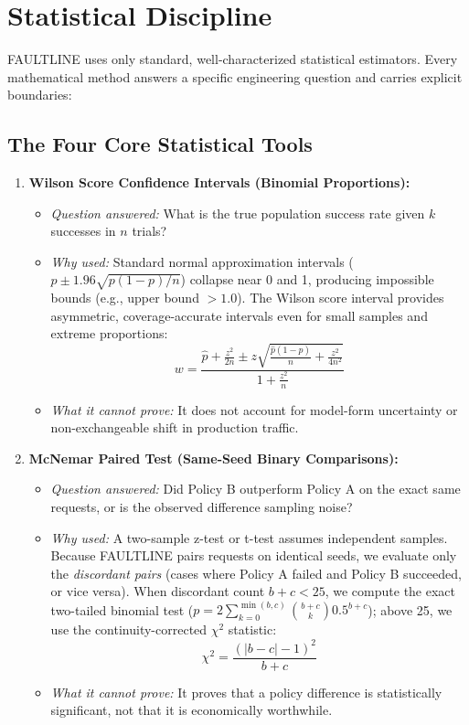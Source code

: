 \vspace{12pt}
\section{Statistical Discipline}

FAULTLINE uses only standard, well-characterized statistical estimators. Every mathematical method answers a specific engineering question and carries explicit boundaries:

\subsection{The Four Core Statistical Tools}

\begin{enumerate}
    \item \textbf{Wilson Score Confidence Intervals (Binomial Proportions):}
    \begin{itemize}
        \item \textit{Question answered:} What is the true population success rate given $k$ successes in $n$ trials?
        \item \textit{Why used:} Standard normal approximation intervals ($p \pm 1.96\sqrt{p(1-p)/n}$) collapse near 0 and 1, producing impossible bounds (e.g., upper bound $>1.0$). The Wilson score interval provides asymmetric, coverage-accurate intervals even for small samples and extreme proportions:
        \[
        w = \frac{\hat{p} + \frac{z^2}{2n} \pm z \sqrt{\frac{\hat{p}(1-\hat{p})}{n} + \frac{z^2}{4n^2}}}{1 + \frac{z^2}{n}}
        \]
        \item \textit{What it cannot prove:} It does not account for model-form uncertainty or non-exchangeable shift in production traffic.
    \end{itemize}

    \item \textbf{McNemar Paired Test (Same-Seed Binary Comparisons):}
    \begin{itemize}
        \item \textit{Question answered:} Did Policy B outperform Policy A on the exact same requests, or is the observed difference sampling noise?
        \item \textit{Why used:} A two-sample z-test or t-test assumes independent samples. Because FAULTLINE pairs requests on identical seeds, we evaluate only the \textit{discordant pairs} (cases where Policy A failed and Policy B succeeded, or vice versa). When discordant count $b + c < 25$, we compute the exact two-tailed binomial test ($p = 2 \sum_{k=0}^{\min(b,c)} \binom{b+c}{k} 0.5^{b+c}$); above 25, we use the continuity-corrected $\chi^2$ statistic:
        \[
        \chi^2 = \frac{(|b - c| - 1)^2}{b + c}
        \]
        \item \textit{What it cannot prove:} It proves that a policy difference is statistically significant, not that it is economically worthwhile.
    \end{itemize}


\end{enumerate}
